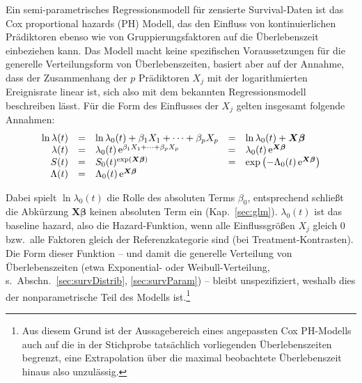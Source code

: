 Ein semi-parametrisches Regressionsmodell für zensierte Survival-Daten ist das Cox proportional hazards (PH) Modell, das den Einfluss von kontinuierlichen Prädiktoren ebenso wie von Gruppierungsfaktoren auf die Überlebenszeit einbeziehen kann. Das Modell macht keine spezifischen Voraussetzungen für die generelle Verteilungsform von Überlebenszeiten, basiert aber auf der Annahme, dass der Zusammenhang der $p$ Prädiktoren $X_{j}$ mit der logarithmierten Ereignisrate linear ist, sich also mit dem bekannten Regressionsmodell beschreiben lässt. Für die Form des Einflusses der $X_{j}$ gelten insgesamt folgende Annahmen:
\begin{equation*}
\begin{array}{rclcl}
\ln \lambda(t) &=& \ln \lambda_{0}(t) + \beta_{1} X_{1} + \dots + \beta_{p} X_{p}           &=& \ln \lambda_{0}(t) + \bm{X} \bm{\beta}\\
    \lambda(t) &=&     \lambda_{0}(t) \, {\mathrm{e}}^{\beta_{1} X_{1} + \dots + \beta_{p} X_{p}} &=& \lambda_{0}(t) \, {\mathrm{e}}^{\bm{X} \bm{\beta}}\\
S(t)           &=& S_{0}(t)^{\exp(\bm{X} \bm{\beta})} &=& \exp\left(-\Lambda_{0}(t) \, {\mathrm{e}}^{\bm{X} \bm{\beta}}\right)\\
\Lambda(t)     &=& \Lambda_{0}(t) \, {\mathrm{e}}^{\bm{X} \bm{\beta}} & &
\end{array}
\end{equation*}

Dabei spielt $\ln \lambda_{0}(t)$ die Rolle des absoluten Terms $\beta_{0}$, entsprechend schließt die Abkürzung $\bm{X} \bm{\beta}$ keinen absoluten Term ein (Kap.\ \ref{sec:glm}). $\lambda_{0}(t)$ ist das baseline hazard, also die Hazard-Funktion, wenn alle Einflussgrößen $X_{j}$ gleich $0$ bzw.\ alle Faktoren gleich der Referenzkategorie sind (bei Treatment-Kontrasten). Die Form dieser Funktion -- und damit die generelle Verteilung von Überlebenszeiten (etwa Exponential- oder Weibull-Verteilung, s.\ Abschn.\ \ref{sec:survDistrib}, \ref{sec:survParam}) -- bleibt unspezifiziert, weshalb dies der nonparametrische Teil des Modells ist.\footnote{Aus diesem Grund ist der Aussagebereich eines angepassten Cox PH-Modells auch auf die in der Stichprobe tatsächlich vorliegenden Überlebenszeiten begrenzt, eine Extrapolation über die maximal beobachtete Überlebenszeit hinaus also unzulässig.}

